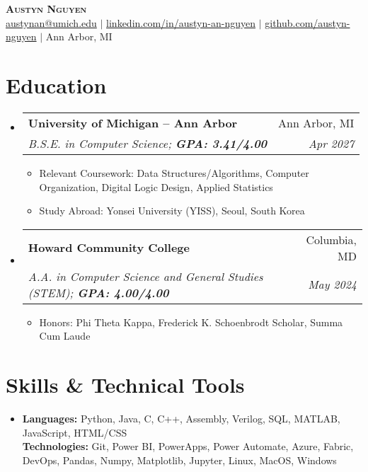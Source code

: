 \documentclass[letterpaper,11pt]{article}
\makeatletter
\newcommand{\resumeItem}[1]{\item[\textopenbullet]\small{#1 \vspace{-2pt}}}
\newcommand{\resumeSubheading}[4]{
  \vspace{-2pt}\item
  \begin{tabular*}{0.97\textwidth}[t]{l@{\extracolsep{\fill}}r}
    \textbf{#1} & #2 \\
    \textit{\small#3} & \textit{\small #4} \\
  \end{tabular*}\vspace{-7pt}
}
\newcommand{\resumeSubHeadingListStart}{\begin{itemize}[leftmargin=0.15in, label={}]}
\newcommand{\resumeSubHeadingListEnd}{\end{itemize}}
\newcommand{\resumeItemListStart}{\begin{itemize}[leftmargin=0.2in, label=\textopenbullet]}
\newcommand{\resumeItemListEnd}{\end{itemize}\vspace{-5pt}}
\makeatother
\begin{document}
\begin{center}
  \textbf{\Huge \scshape Austyn Nguyen} \\ \vspace{3pt}
  \small
  \faEnvelope \hspace{.5pt} \href{mailto:austynan@umich.edu}{austynan@umich.edu}
  $|$
  \faLinkedinSquare \hspace{.5pt} \href{https://www.linkedin.com/in/austyn-an-nguyen}{linkedin.com/in/austyn-an-nguyen}
  $|$
  \faGithub \hspace{.5pt} \href{https://github.com/austyn-nguyen}{github.com/austyn-nguyen}
  $|$
  \faMapMarker \hspace{.5pt} Ann Arbor, MI
\end{center}

\section{Education}
\resumeSubHeadingListStart
  \resumeSubheading
    {University of Michigan -- Ann Arbor}{Ann Arbor, MI}
    {B.S.E. in Computer Science; \textbf{GPA: 3.41/4.00}}{Apr 2027}
    \resumeItemListStart
      \resumeItem{Relevant Coursework: Data Structures/Algorithms, Computer Organization, Digital Logic Design, Applied Statistics}
      \resumeItem{Study Abroad: Yonsei University (YISS), Seoul, South Korea}
    \resumeItemListEnd

  \resumeSubheading
    {Howard Community College}{Columbia, MD}
    {A.A. in Computer Science and General Studies (STEM); \textbf{GPA: 4.00/4.00}}{May 2024}
    \resumeItemListStart
        \resumeItem{Honors: Phi Theta Kappa, Frederick K. Schoenbrodt Scholar, Summa Cum Laude}
    \resumeItemListEnd
\resumeSubHeadingListEnd

\section{Skills \& Technical Tools}
\resumeSubHeadingListStart
  \item{
    \textbf{Languages:} Python, Java, C, C++, Assembly, Verilog, SQL, MATLAB, JavaScript, HTML/CSS \\
    \textbf{Technologies:} Git, Power BI, PowerApps, Power Automate, Azure, Fabric, DevOps, Pandas, Numpy, Matplotlib, Jupyter, Linux, MacOS, Windows
  }
\resumeSubHeadingListEnd

\end{document}

